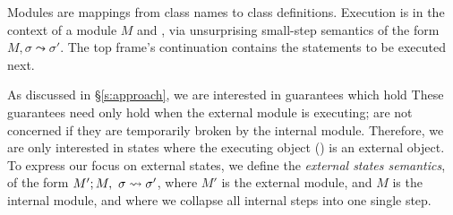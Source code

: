  Modules are mappings
from class names to class definitions. 
Execution 
is in the context of  a module $M$ and   ,
  via unsurprising small-step semantics of the form \ \ 
   $M, \sigma \leadsto \sigma'$.
The   top frame's continuation contains the statements to be %
executed next.
 
As discussed in \S \ref{s:approach}, we are interested in guarantees which hold
 These guarantees need only hold 
when the external module is executing; \scd{we} are not concerned if they are
temporarily broken by the internal module. Therefore, we are only interested in states where the
executing object (\prg{this}) is an external object. 
To express our focus on external states, we define the  \emph{external states semantics}, of the form 
$M' ; M,\ \sigma \leadsto \sigma'$, where $M'$ is the external
module, and $M$ is the internal module, and where we
collapse all internal steps into one single step.

 

